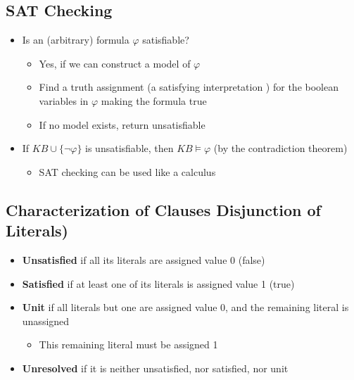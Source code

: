 \documentclass[conference, a4paper]{styles/acmsiggraph}
\begin{document}
    
    
    
    
    
    
    
    \subsection{SAT Checking}
        \begin{itemize}
            \item Is an (arbitrary) formula $\varphi$ satisfiable?
                \begin{itemize}
                    \item Yes, if we can construct a model of $\varphi$
                    \item Find a truth assignment (a satisfying interpretation ) for the boolean variables in $\varphi$ making the formula true
                    \item If no model exists, return unsatisfiable
                \end{itemize}
            \item If $KB \cup \{ \lnot \varphi \}$ is unsatisfiable, then $KB \vDash \varphi$ (by the contradiction theorem)
                \begin{itemize}
                    \item SAT checking can be used like a calculus
                \end{itemize}
        \end{itemize}
    
    
    \subsection{Characterization of Clauses Disjunction of Literals)}
        \begin{itemize}
            \item \textbf{Unsatisfied} if all its literals are assigned value 0 (false)
            \item \textbf{Satisfied} if at least one of its literals is assigned value 1 (true)
            \item \textbf{Unit} if all literals but one are assigned value 0, and the remaining literal is unassigned
                \begin{itemize}
                    \item This remaining literal must be assigned 1
                \end{itemize}
            \item \textbf{Unresolved} if it is neither unsatisfied, nor satisfied, nor unit
        \end{itemize}
    
\end{document}
